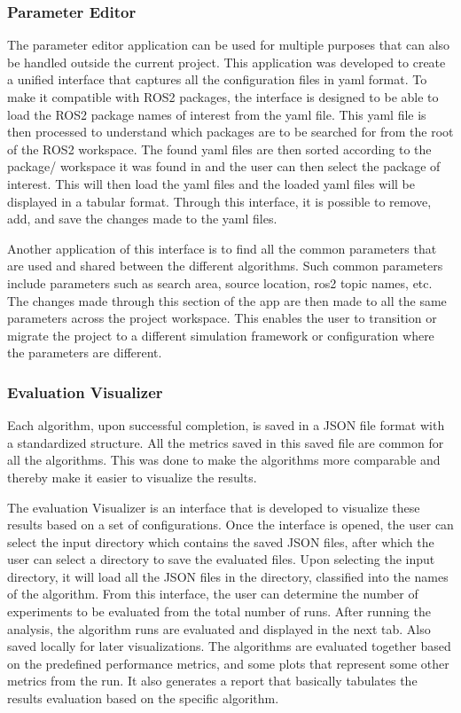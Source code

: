 \documentclass[../report.tex]{subfiles}
\begin{document}
    \subsubsection{Parameter Editor}
    The parameter editor application can be used for multiple purposes that can also be handled outside the current project. This application was developed to create a unified interface that
    captures all the configuration files in yaml format. To make it compatible with ROS2 packages, the interface is designed to be able to load the ROS2 package names of interest from 
    the yaml file. This yaml file is then processed to understand which packages are to be searched for from the root of the ROS2 workspace. The found yaml files are then sorted according to the package/ workspace it was found in
    and the user can then select the package of interest. This will then load the yaml files and the loaded yaml files will be displayed in a tabular format. Through this interface,
    it is possible to remove, add, and save the changes made to the yaml files. 
   
    Another application of this interface is to find all the common parameters that are used and shared between the different algorithms. Such common parameters include parameters such as search area, source location, ros2 topic names, etc. 
    The changes made through this section of the app are then made to all the same parameters across the project workspace. This enables the user to transition or migrate the project to 
    a different simulation framework or configuration where the parameters are different.

    \subsubsection{Evaluation Visualizer}

    Each algorithm, upon successful completion, is saved in a JSON file format with a standardized structure. All the metrics saved in this saved file are common for all the algorithms. 
    This was done to make the algorithms more comparable and thereby make it easier to visualize the results. 
   
    The evaluation Visualizer is an interface that is developed to visualize these results based on a set of configurations. Once the interface is opened, the user can select the input directory which contains the 
    saved JSON files, after which the user can select a directory to save the evaluated files. Upon selecting the input directory, it will load all the JSON files in the directory, classified into the names of the algorithm. From this interface, 
    the user can determine the number of experiments to be evaluated from the total number of runs. After running the analysis, the algorithm runs are evaluated and displayed in the next tab. Also saved locally for later visualizations. 
    The algorithms are evaluated together based on the predefined performance metrics, and some plots that represent some other metrics from the run. It also generates a report that basically tabulates the results evaluation based on the specific algorithm. 
   
\end{document}
